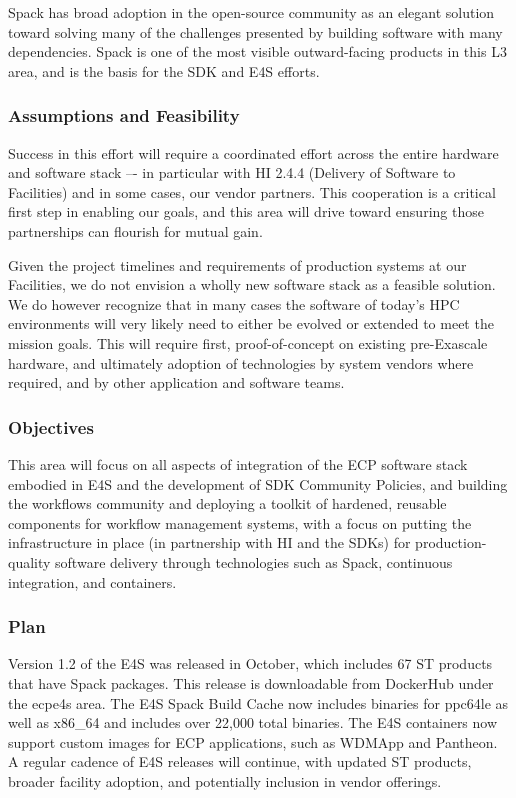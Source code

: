 Spack has broad adoption in the open-source community as an elegant solution toward solving many of the challenges presented by building software with many dependencies. Spack is one of the most visible outward-facing products in this L3 area, and is the basis for the SDK and E4S efforts.

\subsubsection{Assumptions and Feasibility}
Success in this effort will require a coordinated effort across the entire hardware and software stack –- in particular with HI 2.4.4 (Delivery of Software to Facilities) and in some cases, our vendor partners.  This cooperation is a critical first step in enabling our goals, and this area will drive toward ensuring those partnerships can flourish for mutual gain.

Given the project timelines and requirements of production systems at our Facilities, we do not envision a wholly new software stack as a feasible solution. We do however recognize that in many cases the software of today's HPC environments will very likely need to either be evolved or extended to meet the mission goals. This will require first, proof-of-concept on existing pre-Exascale hardware, and ultimately adoption of technologies by system vendors where required, and by other application and software teams.

\subsubsection{Objectives}
This area will focus on all aspects of integration of the ECP software stack embodied in E4S and the development of SDK Community Policies, and building the workflows community and deploying a toolkit of hardened, reusable components for workflow management systems, with a focus on putting the infrastructure in place (in partnership with HI and the SDKs) for production-quality software delivery through technologies such as Spack, continuous integration, and containers. 

\subsubsection{Plan}
Version 1.2 of the E4S was released in October, which includes 67 ST products that have Spack packages. This release is downloadable from DockerHub under the ecpe4s area.  The E4S Spack Build Cache now includes binaries for ppc64le as well as x86\_64 and includes over 22,000 total binaries.  The E4S containers now support custom images for ECP applications, such as WDMApp and Pantheon.  A regular cadence of E4S releases will continue, with updated ST products, broader facility adoption, and potentially inclusion in vendor offerings.

